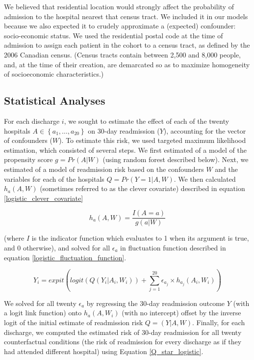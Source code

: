 \documentclass[]{article}\usepackage[]{graphicx}\usepackage[]{color}
\begin{document}
We believed that residential location would strongly affect the probability of admission to the hospital nearest that census tract. We included it in our models because we also expected it to crudely approximate a (expected) confounder: socio-economic status.  We used the residential postal code at the time of admission to assign each patient in the cohort to a census tract, as defined by the 2006 Canadian census. (Census tracts contain between 2,500 and 8,000 people, and, at the time of their creation, are demarcated so as to maximize homogeneity of socioeconomic characteristics.)\supercite{statistics_canada_2006_2007}

\subsection{Statistical Analyses}
For each discharge $i$, we sought to estimate the effect of each of the twenty hospitals $A \in \left\{ {a_1, \dots ,a_{20}}\right\}$ on 30-day readmission ($Y$), accounting for the vector of confounders ($W$). To estimate this risk, we used targeted maximum likelihood estimation, which consisted of several steps. We first estimated of a model of the propensity score $g=Pr(A|W)$ (using random forest described below). Next, we estimated of a model of readmission risk based on the confounders $W$ and the variables for each of the hospitals $Q=Pr(Y=1|A,W)$. We then calculated $h_a(A,W)$ (sometimes referred to as the clever covariate) described in equation \ref{logistic_clever_covariate}

\begin{equation}
\label{logistic_clever_covariate}
h_a(A,W)=\frac{I(A=a)}{g(a|W)}
\end{equation}

(where $I$ is the indicator function which evaluates to 1 when its argument is true, and 0 otherwise), and solved for all ${\epsilon}_a$ in fluctuation function described in equation \ref{logistic_fluctuation_function}.

\begin{equation}
\label{logistic_fluctuation_function}
Y_i=expit(logit(Q(Y_i|A_i,W_i)) + \sum_{j=1}^{20} {\epsilon}_{a_j} \times h_{a_j}(A_i,W_i))
\end{equation}

We solved for all twenty ${\epsilon}_a$ by regressing the 30-day readmission outcome $Y$ (with a logit link function) onto $h_a(A,W_i)$ (with no intercept) offset by the inverse logit of the initial estimate of readmission risk $Q=(Y|A,W)$. Finally, for each discharge, we computed the estimated risk of 30-day readmission for all twenty counterfactual conditions (the risk of readmission for every discharge as if they had attended different hospital) using Equation \ref{Q_star_logistic}.
\end{document}
